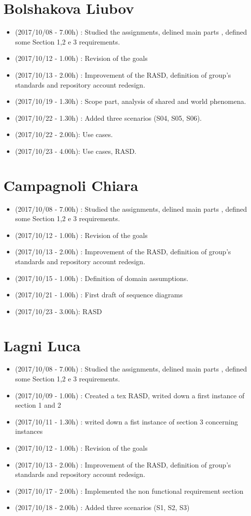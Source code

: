 \documentclass[a4paper,leqno]{book}
\begin{document}
\section{Bolshakova Liubov}
\begin{itemize}
\item (2017/10/08 - 7.00h) : Studied the assignments, delined main parts , defined some Section 1,2 e 3 requirements.
\item (2017/10/12 - 1.00h) : Revision of the goals 
\item (2017/10/13 - 2.00h) : Improvement of the RASD, definition of group's standards and repository account redesign.
\item (2017/10/19 - 1.30h) : Scope part, analysis of shared and world phenomena.
\item (2017/10/22 - 1.30h) : Added three scenarios (S04, S05, S06).
\item (2017/10/22 - 2.00h): Use cases.
\item (2017/10/23 - 4.00h): Use cases, RASD. 
\end{itemize}

\section{Campagnoli Chiara}
\begin{itemize}
\item (2017/10/08 - 7.00h) : Studied the assignments, delined main parts , defined some Section 1,2 e 3 requirements.
\item (2017/10/12 - 1.00h) : Revision of the goals 
\item (2017/10/13 - 2.00h) : Improvement of the RASD, definition of group's standards and repository account redesign.
\item (2017/10/15 - 1.00h) : Definition of domain assumptions.
\item (2017/10/21 - 1.00h) : First draft of sequence diagrams
\item (2017/10/23 - 3.00h): RASD
\end{itemize}

\section{Lagni Luca}
\begin{itemize}
\item (2017/10/08 - 7.00h) : Studied the assignments, delined main parts , defined some Section 1,2 e 3 requirements.
\item (2017/10/09 - 1.00h) : Created a tex RASD, writed down a first instance of section 1 and 2
\item (2017/10/11 - 1.30h) : writed down a fist instance of section 3 concerning instances
\item (2017/10/12 - 1.00h) : Revision of the goals 
\item (2017/10/13 - 2.00h) : Improvement of the RASD, definition of group's standards and repository account redesign.
\item (2017/10/17 - 2.00h) : Implemented the non functional requirement section
\item (2017/10/18 - 2.00h) : Added three scenarios (S1, S2, S3)
\end{itemize}
\end{document}
